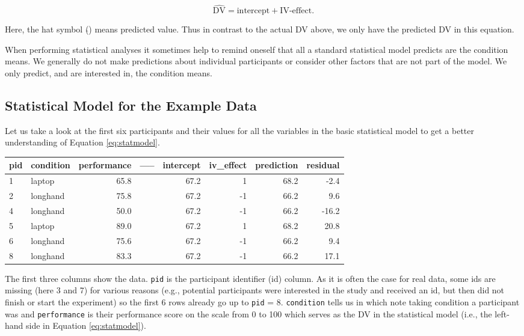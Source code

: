 \documentclass[
]{book}
\begin{document}
\begin{equation}
\hat{\text{DV}} = \text{intercept} + \text{IV-effect}.
\label{eq:predmodel}
\end{equation}

Here, the hat symbol (\(\hat{}\)) means predicted value. Thus in contrast to the actual DV above, we only have the predicted DV in this equation.

When performing statistical analyses it sometimes help to remind oneself that all a standard statistical model predicts are the condition means. We generally do not make predictions about individual participants or consider other factors that are not part of the model. We only predict, and are interested in, the condition means.

\hypertarget{statistical-model-for-the-example-data}{%
\subsection{Statistical Model for the Example Data}\label{statistical-model-for-the-example-data}}

Let us take a look at the first six participants and their values for all the variables in the basic statistical model to get a better understanding of Equation \eqref{eq:statmodel}.

\begin{tabular}{l|l|r|l|r|r|r|r}
\hline
pid & condition & performance & ----- & intercept & iv\_effect & prediction & residual\\
\hline
1 & laptop & 65.8 &  & 67.2 & 1 & 68.2 & -2.4\\
\hline
2 & longhand & 75.8 &  & 67.2 & -1 & 66.2 & 9.6\\
\hline
4 & longhand & 50.0 &  & 67.2 & -1 & 66.2 & -16.2\\
\hline
5 & laptop & 89.0 &  & 67.2 & 1 & 68.2 & 20.8\\
\hline
6 & longhand & 75.6 &  & 67.2 & -1 & 66.2 & 9.4\\
\hline
8 & longhand & 83.3 &  & 67.2 & -1 & 66.2 & 17.1\\
\hline
\end{tabular}

The first three columns show the data. \texttt{pid} is the participant identifier (id) column. As it is often the case for real data, some ids are missing (here 3 and 7) for various reasons (e.g., potential participants were interested in the study and received an id, but then did not finish or start the experiment) so the first 6 rows already go up to \texttt{pid} = 8. \texttt{condition} tells us in which note taking condition a participant was and \texttt{performance} is their performance score on the scale from 0 to 100 which serves as the DV in the statistical model (i.e., the left-hand side in Equation \eqref{eq:statmodel}).
\end{document}
